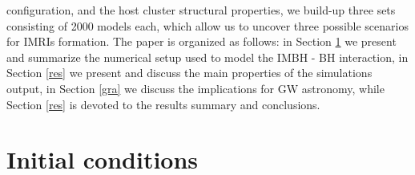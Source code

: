 \documentclass[article]{aa}
\begin{document}
configuration, and the host cluster structural properties, we build-up three sets consisting of 2000 models each, which allow us to uncover three possible scenarios for IMRIs formation.  
The paper is organized as follows: in Section \ref{num} we
present and summarize the numerical setup used to model the IMBH - BH
interaction, in Section \ref{res} we present and discuss the main properties of
the simulations output, in Section \ref{gra} we discuss the implications for GW
astronomy, while Section \ref{res} is devoted to the results summary and
conclusions. 





\section{Initial conditions} 
\label{num}
\end{document}

